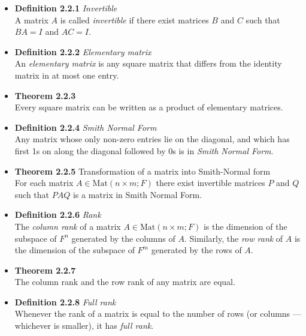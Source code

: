 \documentclass[11pt,a4paper]{article}
\begin{document}
\begin{itemize}

    \item \textbf{Definition 2.2.1} \emph{Invertible} \\
        A matrix $A$ is called \emph{invertible} if there exist matrices $B$ and $C$
        such that
        $BA = I$ and $AC = I$.

    \item \textbf{Definition 2.2.2} \emph{Elementary matrix} \\
        An \emph{elementary matrix} is any square matrix that differs from the identity
        matrix in at most one entry.

    \item \textbf{Theorem 2.2.3} \\
        Every square matrix can be written as a product of elementary matrices.

    \item \textbf{Definition 2.2.4} \emph{Smith Normal Form} \\
        Any matrix whose only non-zero entries lie on the diagonal,
        and which has first 1s on along the diagonal followed by 0s is in
        \emph{Smith Normal Form}.

    \item \textbf{Theorem 2.2.5} Transformation of a matrix into Smith-Normal form \\
        For each matrix $A \in \mathrm{Mat}(n \times m; F)$ there exist invertible matrices
        $P$ and $Q$ such that $PAQ$ is a matrix in Smith Normal Form.

    \item \textbf{Definition 2.2.6} \emph{Rank} \\
        The \emph{column rank} of a matrix $A \in \mathrm{Mat}(n \times m; F)$
        is the dimension of the subspace of $F^n$ generated by the columns of $A$.
        Similarly, the \emph{row rank} of $A$ is the dimension of the subspace of $F^m$
        generated by the rows of $A$.

    \item \textbf{Theorem 2.2.7} \\
        The column rank and the row rank of any matrix are equal.

    \item \textbf{Definition 2.2.8} \emph{Full rank} \\
        Whenever the rank of a matrix is equal to the number of rows
        (or columns --- whichever is smaller), it has \emph{full rank}.

\end{itemize}
\end{document}
